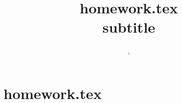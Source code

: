\documentclass[12pt,a4]{article}
\title{\textbf{homework.tex}\\[0.2em]\smaller{}subtitle}
\author{\namea, \\ \nameb}
\date{\dateheader}
\begin{document}
	\section*{homework.tex}
\end{document}
